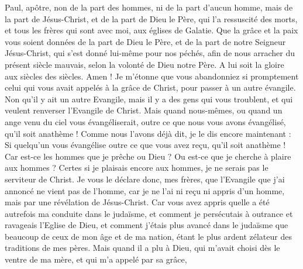 \begin{multicols}{2}
\TextTitle{[Salutations]}
\VerseOne{}Paul, apôtre, non de la part des hommes, ni de la part d'aucun homme, mais de la part de Jésus-Christ, et de la part de Dieu le Père, qui l'a ressuscité des morts,
et tous les frères qui sont avec moi, aux églises de Galatie.
Que la grâce et la paix vous soient données de la part de Dieu le Père, et de la part de notre Seigneur Jésus-Christ,
qui s'est donné lui-même pour nos péchés, afin de nous arracher du présent siècle mauvais, selon la volonté de Dieu notre Père.
A lui soit la gloire aux siècles des siècles. Amen !
Je m'étonne que vous abandonniez si promptement celui qui vous avait appelés à la grâce de Christ, pour passer à un autre évangile. 
Non qu'il y ait un autre Evangile, mais il y a des gens qui vous troublent, et qui veulent renverser l'Evangile de Christ.
Mais quand nous-mêmes, ou quand un ange venu du ciel vous évangéliserait, outre ce que nous vous avons évangélisé, qu'il soit anathème !
Comme nous l'avons déjà dit, je le dis encore maintenant : Si quelqu'un vous évangélise outre ce que vous avez reçu, qu'il soit anathème !
Car est-ce les hommes que je prêche ou Dieu ? Ou est-ce que je cherche à plaire aux hommes ? Certes si je plaisais encore aux hommes, je ne serais pas le serviteur de Christ.
Je vous le déclare donc, mes frères, que l'Evangile que j'ai annoncé ne vient pas de l’homme,
car je ne l'ai ni reçu ni appris d’un homme, mais par une révélation de Jésus-Christ.
Car vous avez appris quelle a été autrefois ma conduite dans le judaïsme, et comment je persécutais à outrance et ravageais l'Eglise de Dieu,
et comment j’étais plus avancé dans le judaïsme que beaucoup de ceux de mon âge et de ma nation, étant le plus ardent zélateur des traditions de mes pères.
Mais quand il a plu à Dieu, qui m'avait choisi dès le ventre de ma mère, et qui m'a appelé par sa grâce,

\end{multicols}
